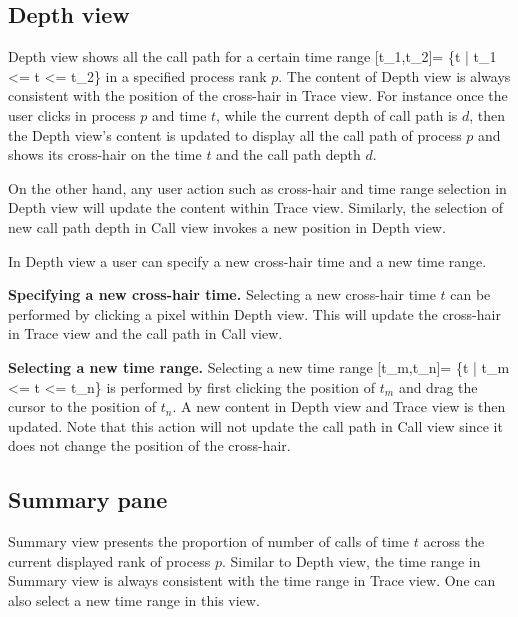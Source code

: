 \documentclass[english]{article}
\begin{document}
\subsection{Depth view}

Depth view shows all the call path for a certain time range [t_1,t_2]= \{t | t_1 <= t <= t_2\} in a specified process rank $p$. The content of Depth view is always consistent with the position of the cross-hair in Trace view.
For instance once the user clicks in process $p$ and time $t$, while the current depth of call path is $d$, then the Depth view's content is updated to display all the call path of process $p$ and shows its cross-hair on the time $t$ and the call path depth $d$.

On the other hand, any user action such as cross-hair and time range selection in Depth view will update the content within Trace view. Similarly, the selection of new call path depth in Call view invokes a new position in Depth view.

In Depth view a user can specify a new cross-hair time and a new time range.

\textbf{Specifying a new cross-hair time.} Selecting a new cross-hair time $t$ can be performed by clicking a pixel within Depth view. This will update the cross-hair in Trace view and the call path in Call view.

\textbf{Selecting a new time range.} Selecting a new time range [t_m,t_n]= \{t | t_m <= t <= t_n\} is performed by first clicking the position of $t_m$ and drag the cursor to the position of $t_n$. A new content in Depth view and Trace view is then updated. Note that this action will not update the call path in Call view since it does not change the position of the cross-hair.


\subsection{Summary pane}

Summary view presents the proportion of number of calls of time $t$ across the current displayed rank of process $p$.
Similar to Depth view, the time range in Summary view is always consistent with the time range in Trace view.
One can also select a new time range in this view.


\end{document}
